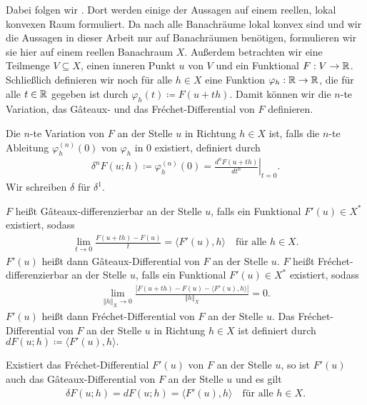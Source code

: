Dabei folgen wir \cite[S. 189-194]{Zei85}. 
Dort werden einige der Aussagen auf einem reellen, lokal konvexen
Raum formuliert. Da nach \cite[S. 781, (43)]{Zei86} alle Banachräume 
lokal konvex sind und wir die Aussagen in dieser Arbeit
nur auf Banachräumen benötigen, formulieren wir sie hier auf einem reellen 
Banachraum $X$. 
Außerdem betrachten wir eine Teilmenge $V\subseteq X$, einen
inneren Punkt $u$ von $V$ und ein Funktional $F:V\to\mathbb{R}$. 
Schließlich definieren wir noch für alle $h\in X$ eine Funktion
$\varphi_h:\mathbb{R}\to\mathbb{R}$, die für alle $t\in\mathbb{R}$ gegeben ist durch
$\varphi_h(t)\coloneqq F(u+th)$.
Damit können wir die $n$-te Variation, das G\^ateaux- und das 
Fr\'echet-Differential von $F$ definieren.

\begin{definition}[$n$-te Variation]
  Die $n$-te Variation von $F$ an der Stelle $u$ in Richtung $h\in X$ ist,
  falls die $n$-te Ableitung $\varphi_h^{(n)}(0)$ von $\varphi_h$ in $0$
  existiert, definiert durch 
  \begin{align*}
    \delta^n F(u;h)\coloneqq \varphi_h^{(n)}(0)=
    \left. \frac{d^n F(u+th)}{dt^n}\right|_{t=0}.
  \end{align*}
  Wir schreiben $\delta$ für $\delta^1$.
\end{definition}

\begin{definition}
  $F$ heißt G\^ateaux-differenzierbar an der Stelle $u$, falls ein 
  Funktional $F'(u)\in X^\ast$ existiert, sodass
  \begin{align*}
    \lim_{t\to 0}\frac{F(u+th)-F(u)}{t} = \langle F'(u), h\rangle\quad
    \text{für alle } h\in X.
  \end{align*}
  $F'(u)$ heißt dann G\^ateaux-Differential von $F$ an der Stelle $u$.
  $F$ heißt Fr\'echet-dif\-fe\-ren\-zier\-bar an der Stelle $u$, falls ein
  Funktional $F'(u)\in X^\ast$ existiert, sodass
  \begin{align*}
    \lim_{\Vert h\Vert_X\to 0}\frac{|F(u+th)-F(u)-
    \langle F'(u),h\rangle|}{\Vert h\Vert_X} =0.
  \end{align*}
  $F'(u)$ heißt dann Fr\'echet-Differential von $F$ an der Stelle $u$.
  Das Fr\'echet-Differential von $F$ an der Stelle $u$ in Richtung $h\in X$
  ist definiert durch $dF(u;h)\coloneqq \langle F'(u),h\rangle.$
\end{definition}

\begin{remark}
  Existiert das Fr\'echet-Differential $F'(u)$ von $F$ an der Stelle
    $u$, so ist $F'(u)$ auch das G\^ateaux-Differential von $F$ an der Stelle
    $u$ und es gilt 
    \begin{align*}
      \delta F(u;h)=dF(u;h)=\langle F'(u),h\rangle\quad\text{für alle } h\in X.
    \end{align*}
\end{remark}

